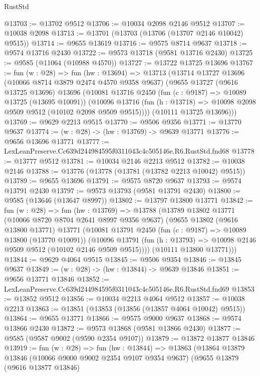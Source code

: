 \begin{lexlean}{RustStd}
\begin{coremodule}
@13703 := @13702 @9512
@13706 := @10034 @2098 @2146 @9512
@13707 := @10038 @2098
@13713 := @13701 (@13703 (@13706 (@13707 @2146 @10042) @9515))
@13714 := @9655 @13619
@13716 := @9575 @8714 @9637
@13718 := @9574 @13716 @2430
@13722 := @9573 @13718 (@9581 @13716 @2430)
@13725 := @9585 (@11064 (@10988 @4570))
@13727 := @13722 @13725 @13696
@13767 := fun (w : @28) =>
  fun (hw : @13694) =>
  @13713
    (@13714
      @13727
      @13696
      (@10066 @8714 @3879 @2474 @4570 @9358 @9637)
      (@9655
        @13727
        (@9616 @13725 @13696)
        @13696
        (@10081
          @13716
          @2450
          (fun (c : @9187) => @10089 @13725 (@13695 @10091))
          (@10096 @13716 (fun (h : @13718) => @10098 @2098 @9509 @9512 (@10102 @2098 @9509 @9515))))
        (@10111 @13725 @13696)))
@13769 := @9629 @2213 @9515
@13770 := @9506 @9356
@13771 := @13770 @9637
@13774 := (w : @28) -> (hw : @13769) -> @9639 @13771
@13776 := @9656 @13696 @13771
@13777 := LexLeanPreserve.Cc639d244984595f0311043c4c505146e.R6.RustStd.fnd68
@13778 := @13777 @9512
@13781 := @10034 @2146 @2213 @9512
@13782 := @10038 @2146
@13788 := @13776 (@13778 (@13781 (@13782 @2213 @10042) @9515))
@13789 := @9655 @13696
@13791 := @9575 @8720 @9637
@13793 := @9574 @13791 @2430
@13797 := @9573 @13793 (@9581 @13791 @2430)
@13800 := @9585 (@13646 (@13647 @8997))
@13802 := @13797 @13800 @13771
@13842 := fun (w : @28) =>
  fun (hw : @13769) =>
  @13788
    (@13789
      @13802
      @13771
      (@10066 @8720 @8704 @2641 @8997 @9356 @9637)
      (@9655
        @13802
        (@9616 @13800 @13771)
        @13771
        (@10081
          @13791
          @2450
          (fun (c : @9187) => @10089 @13800 (@13770 @10091))
          (@10096 @13791 (fun (h : @13793) => @10098 @2146 @9509 @9512 (@10102 @2146 @9509 @9515))))
        (@10111 @13800 @13771)))
@13844 := @9629 @4064 @9515
@13845 := @9506 @9354
@13846 := @13845 @9637
@13849 := (w : @28) -> (hw : @13844) -> @9639 @13846
@13851 := @9656 @13771 @13846
@13852 := LexLeanPreserve.Cc639d244984595f0311043c4c505146e.R6.RustStd.fnd69
@13853 := @13852 @9512
@13856 := @10034 @2213 @4064 @9512
@13857 := @10038 @2213
@13863 := @13851 (@13853 (@13856 (@13857 @4064 @10042) @9515))
@13864 := @9655 @13771
@13866 := @9575 @9000 @9637
@13868 := @9574 @13866 @2430
@13872 := @9573 @13868 (@9581 @13866 @2430)
@13877 := @9585 (@9587 @9002 (@9590 @2354 @9107))
@13879 := @13872 @13877 @13846
@13919 := fun (w : @28) =>
  fun (hw : @13844) =>
  @13863
    (@13864
      @13879
      @13846
      (@10066 @9000 @9002 @2354 @9107 @9354 @9637)
      (@9655
        @13879
        (@9616 @13877 @13846)

\end{coremodule}
\end{lexlean}
